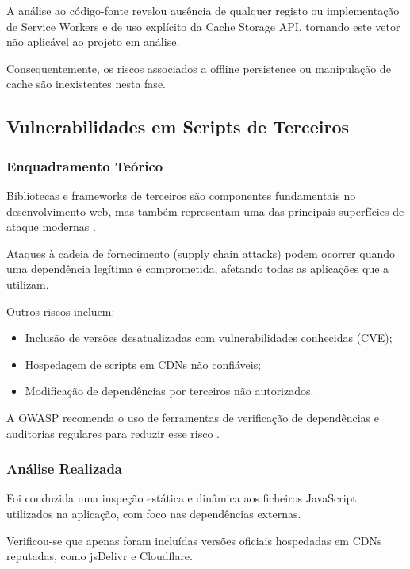 A análise ao código-fonte revelou ausência de qualquer registo ou implementação de Service Workers e de uso explícito da Cache Storage API, tornando este vetor não aplicável ao projeto em análise.

Consequentemente, os riscos associados a offline persistence ou manipulação de cache são inexistentes nesta fase.

\subsection{Vulnerabilidades em Scripts de Terceiros}

\subsubsection{Enquadramento Teórico}

Bibliotecas e frameworks de terceiros são componentes fundamentais no desenvolvimento web, mas também representam uma das principais superfícies de ataque modernas \cite{ref10}.

Ataques à cadeia de fornecimento (supply chain attacks) podem ocorrer quando uma dependência legítima é comprometida, afetando todas as aplicações que a utilizam.

Outros riscos incluem:

\begin{itemize}

\item Inclusão de versões desatualizadas com vulnerabilidades conhecidas (CVE);

\item Hospedagem de scripts em CDNs não confiáveis;

\item Modificação de dependências por terceiros não autorizados.

\end{itemize}

A OWASP recomenda o uso de ferramentas de verificação de dependências e auditorias regulares para reduzir esse risco \cite{ref11}.

\subsubsection{Análise Realizada}

Foi conduzida uma inspeção estática e dinâmica aos ficheiros JavaScript utilizados na aplicação, com foco nas dependências externas.

Verificou-se que apenas foram incluídas versões oficiais hospedadas em CDNs reputadas, como jsDelivr e Cloudflare.

